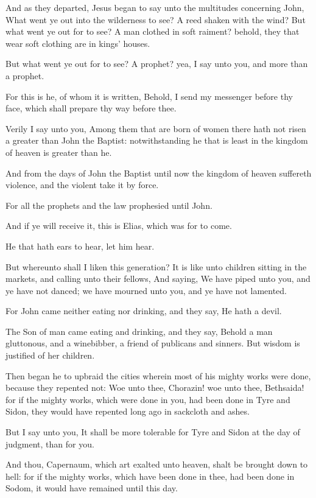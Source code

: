 \verse And as they departed, Jesus began to say unto the multitudes concerning John, What went ye out into the wilderness to see? A reed shaken with the wind?  \verse But what went ye out for to see? A man clothed in soft raiment?  behold, they that wear soft clothing are in kings' houses.

\verse But what went ye out for to see? A prophet? yea, I say unto you, and more than a prophet.

\verse For this is he, of whom it is written, Behold, I send my messenger before thy face, which shall prepare thy way before thee.

\verse Verily I say unto you, Among them that are born of women there hath not risen a greater than John the Baptist: notwithstanding he that is least in the kingdom of heaven is greater than he.

\verse And from the days of John the Baptist until now the kingdom of heaven suffereth violence, and the violent take it by force.

\verse For all the prophets and the law prophesied until John.

\verse And if ye will receive it, this is Elias, which was for to come.

\verse He that hath ears to hear, let him hear.

\verse But whereunto shall I liken this generation? It is like unto children sitting in the markets, and calling unto their fellows, \verse And saying, We have piped unto you, and ye have not danced; we have mourned unto you, and ye have not lamented.

\verse For John came neither eating nor drinking, and they say, He hath a devil.

\verse The Son of man came eating and drinking, and they say, Behold a man gluttonous, and a winebibber, a friend of publicans and sinners.  But wisdom is justified of her children.

\verse Then began he to upbraid the cities wherein most of his mighty works were done, because they repented not: \verse Woe unto thee, Chorazin! woe unto thee, Bethsaida! for if the mighty works, which were done in you, had been done in Tyre and Sidon, they would have repented long ago in sackcloth and ashes.

\verse But I say unto you, It shall be more tolerable for Tyre and Sidon at the day of judgment, than for you.

\verse And thou, Capernaum, which art exalted unto heaven, shalt be brought down to hell: for if the mighty works, which have been done in thee, had been done in Sodom, it would have remained until this day.

